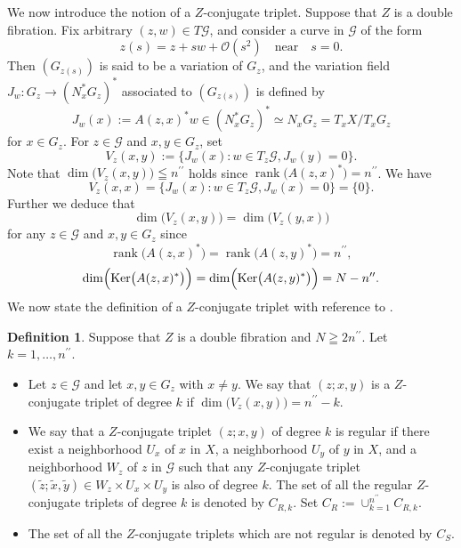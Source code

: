 \documentclass[a4paper,11pt,reqno]{amsart}
\theoremstyle{definition}
\newtheorem{definition}[theorem]{Definition}
\theoremstyle{remark}
\begin{document}
%
%
We now introduce the notion of a $Z$-conjugate triplet. 
Suppose that $Z$ is a double fibration. 
Fix arbitrary $(z,w) \in T\mathcal{G}$, and consider a curve in $\mathcal{G}$ of the form 
%
%
$$
z(s)=z+sw+\mathcal{O}(s^2)
\quad\text{near}\quad
s=0. 
$$
%
%
Then $(G_{z(s)})$ is said to be a variation of $G_z$, 
and the variation field $J_w : G_z \rightarrow (N^\ast_xG_z)^\ast$ 
associated to $(G_{z(s)})$ is defined by 
%
%
$$
J_w(x)
:=
A(z,x)^\ast{w}
\in 
(N^\ast_xG_z)^\ast
\simeq
N_xG_z
=
T_xX/T_xG_z
$$
%
%
for $x \in G_z$. 
For $z \in \mathcal{G}$ and $x,y \in G_z$, set 
%
%
$$
V_z(x,y)
:=
\{J_w(x) : w \in T_z\mathcal{G}, J_w(y)=0\}. 
$$
%
%
Note that $\dim\bigl(V_z(x,y)\bigr) \leqq n^{\prime\prime}$ holds 
since $\operatorname{rank}\bigl(A(z,x)^\ast\bigr)=n^{\prime\prime}$. 
We have 
%
%
$$
V_z(x,x)=\{J_w(x) : w \in T_z\mathcal{G}, J_w(x)=0\}=\{0\}.
$$
%
% 
Further we deduce that 
%
%
$$
\dim\bigl(V_z(x,y)\bigr) = \dim\bigl(V_z(y,x)\bigr)
$$
%
%
for any $z \in \mathcal{G}$ and $x,y \in G_z$ since 
%
%
$$
\operatorname{rank}\bigl(A(z,x)^\ast\bigr)
=
\operatorname{rank}\bigl(A(z,y)^\ast\bigr)
=
n^{\prime\prime}, 
$$
%
%
$$
\dim\Bigl(\operatorname{Ker}\bigl(A(z,x)^\ast\bigr)\Bigr)
=
\dim\Bigl(\operatorname{Ker}\bigl(A(z,y)^\ast\bigr)\Bigr)
=
N-n^{\prime\prime}. 
$$
%
%
We now state the definition of a $Z$-conjugate triplet with reference to 
\cite{HolmanUhlmann,MazzucchelliSaloTzou}.  
%
%
\begin{definition}
\label{theorem:z-conjugate} 
Suppose that $Z$ is a double fibration and $N \geqq 2n^{\prime\prime}$. 
Let $k=1,\dotsc,n^{\prime\prime}$. 
%
%
\begin{itemize}
\item 
Let $z \in \mathcal{G}$ and let $x,y \in G_z$ with $x{\ne}y$.  
We say that $(z;x,y)$ is a $Z$-conjugate triplet of degree $k$ 
if $\dim\bigl(V_z(x,y)\bigr)=n^{\prime\prime}-k$. 
\item
We say that a $Z$-conjugate triplet $(z;x,y)$ of degree $k$ is regular if there exist 
a neighborhood $U_x$ of $x$ in $X$, 
a neighborhood $U_y$ of $y$ in $X$, 
and 
a neighborhood $W_z$ of $z$ in $\mathcal{G}$ 
such that any $Z$-conjugate triplet 
$(\tilde{z};\tilde{x},\tilde{y}) \in W_z{\times}U_x{\times}U_y$ 
is also of degree $k$. 
The set of all the regular $Z$-conjugate triplets of degree $k$ is denoted by $C_{R,k}$. 
Set $C_R:=\cup_{k=1}^{n^{\prime\prime}}C_{R,k}$.
\item 
The set of all the $Z$-conjugate triplets which are not regular is denoted by $C_S$. 
\end{itemize}
%
%
\end{definition}
\end{document}
